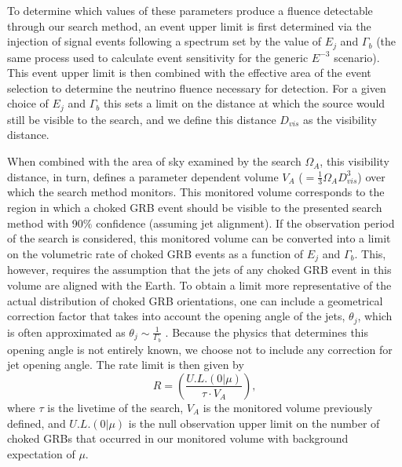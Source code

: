 \documentclass[manuscript]{aastex}
\begin{document}
To determine which values of these parameters produce a fluence detectable through our search method, an event upper limit is first determined via the injection of signal events following a spectrum set by the value of $E_j$ and $\Gamma_b$ (the same process used to calculate event sensitivity for the generic $E^{-3}$ scenario). This event upper limit is then combined with the effective area of the event selection to determine the neutrino fluence necessary for detection. For a given choice of $E_j$ and $\Gamma_b$ this sets a limit on the distance at which the source would still be visible to the search, and we define this distance $D_{vis}$ as the visibility distance.

When combined with the area of sky examined by the search $\Omega_{A}$, this visibility distance, in turn, defines a parameter dependent volume $V_A$ ($=\frac{1}{3}\Omega_{A}D_{vis}^{3}$) over which the search method monitors. This monitored volume corresponds to the region in which a choked GRB event should be visible to the presented search method with 90$\%$ confidence (assuming jet alignment). If the observation period of the search is considered, this monitored volume can be converted into a limit on the volumetric rate of choked GRB events as a function of $E_j$ and $\Gamma_b$. This, however, requires the assumption that the jets of any choked GRB event in this volume are aligned with the Earth. To obtain a limit more representative of the actual distribution of choked GRB orientations, one can include a geometrical correction factor that takes into account the opening angle of the jets, $\theta_j$, which is often approximated as $\theta_j \sim \frac{1}{\Gamma_b}$ \citep{2013ApJ...777..162M}. Because the physics that determines this opening angle is not entirely known, we choose not to include any correction for jet opening angle. The rate limit is then given by
\begin{equation}\label{eq:ratelimit}
R = \left(\frac{U.L.(0|\mu)}{\tau \cdot V_A}\right),
\end{equation}
where $\tau$ is the livetime of the search, $V_A$ is the monitored volume previously defined, and $U.L.(0|\mu)$ is the null observation upper limit on the number of choked GRBs that occurred in our monitored volume with background expectation of $\mu$.
\end{document}
